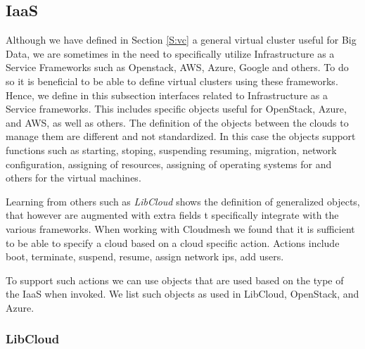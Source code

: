\documentclass[10pt]{article}
\begin{document}






\subsection{IaaS}

Although we have defined in Section \ref{S:vc} a general virtual
cluster useful for Big Data, we are sometimes in the need to
specifically utilize Infrastructure as a Service Frameworks such as
Openstack, AWS, Azure, Google and others. To do so it is beneficial to
be able to define virtual clusters using these frameworks. Hence, we
define in this subsection interfaces related to Infrastructure as a
Service frameworks. This includes specific objects useful for
OpenStack, Azure, and AWS, as well as others. The definition of the
objects between the clouds to manage them are different and not
standardized. In this case the objects support functions such as
starting, stoping, suspending resuming, migration, network
configuration, assigning of resources, assigning of operating systems
for and others for the virtual machines.

Learning from others such as {\it LibCloud} shows the definition of
generalized objects, that however are augmented with extra fields t
specifically integrate with the various frameworks. When working with
Cloudmesh we found that it is sufficient to  be able to specify a
cloud based on a cloud specific action. Actions include boot,
terminate, suspend, resume, assign network ips, add users.

To support such actions we can use objects that are used based on the
type of the IaaS when invoked. We list such objects as used in
LibCloud, OpenStack, and Azure. 

\subsubsection{LibCloud}
\end{document}
